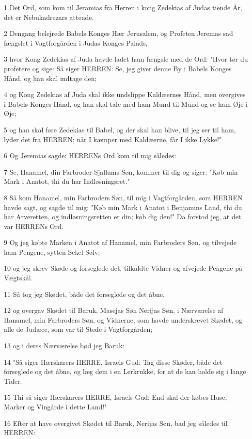 \par 1 Det Ord, som kom til Jeramias fra Herren i kong Zedekias af Judas tiende År, det er Nebukadrezars attende.
\par 2 Dengang belejrede Babels Konges Hær Jerusalem, og Profeten Jeremas sad fængslet i Vagtforgården i Judas Konges Palads,
\par 3 hvor Kong Zedekias af Juda havde ladet ham fængsle med de Ord: "Hvor tør du profetere og sige: Så siger HERREN: Se, jeg giver denne By i Babels Konges Hånd, og han skal indtage den;
\par 4 og Kong Zedekias af Juda skal ikke undslippe Kaldæernes Hånd, men overgives i Babels Konges Hånd, og han skal tale med ham Mund til Mund og se ham Øje i Øje;
\par 5 og han skal føre Zedekias til Babel, og der skal han blive, til jeg ser til ham, lyder det fra HERREN; når I kæmper med Kaldæerne, får I ikke Lykke!"
\par 6 Og Jeremias sagde: HERRENs Ord kom til mig således:
\par 7 Se, Hanamel, din Farbroder Sjallums Søn, kommer til dig og siger: "Køb min Mark i Anatot, thi du har Indløsningsret."
\par 8 Så kom Hanamel, min Farbroders Søn, til mig i Vagtforgården, som HERREN havde sagt, og sagde til mig: "Køb min Mark i Anatot i Benjamins Land, thi du har Arveretten, og indløsningsretten er din; køb dig den!" Da forstod jeg, at det var HERRENs Ord.
\par 9 Og jeg købte Marken i Anatot af Hanamel, min Farbroders Søn, og tilvejede ham Pengene, sytten Sekel Sølv;
\par 10 og jeg skrev Skøde og forseglede det, tilkaldte Vidner og afvejede Pengene på Vægtskål.
\par 11 Så tog jeg Skødet, både det forseglede og det åbne,
\par 12 og overgav Skødet til Baruk, Masejas Søn Nerijas Søn, i Nærværelse af Hanamel, min Farbroders Søn, og Vidnerne, som havde underskrevet Skødet, og alle de Judæee, som var til Stede i Vagtforgården;
\par 13 og i deres Nærværelse bød jeg Baruk:
\par 14 "Så siger Hærskarers HERRE, Israels Gud: Tag disse Skøder, både det forseglede og det åbne, og læg dem i en Lerkrukke, for at de kan holde sig i lange Tider.
\par 15 Thi så siger Hærskarers HERRE, Israels Gud: End skal der købes Huse, Marker og Vingårde i dette Land!"
\par 16 Efter at have overgivet Skødet til Baruk, Nerijas Søn, bad jeg således til HERREN:
